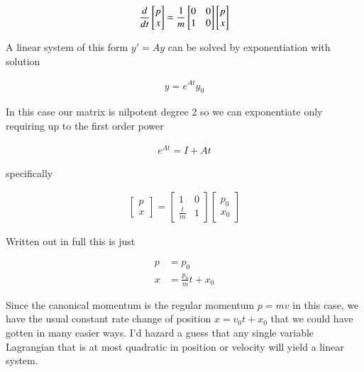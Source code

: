 \begin{align}\label{eqn:hamiltonian:boo4}
\frac{d}{dt}
\begin{bmatrix}
p \\
x
\end{bmatrix}
=
\frac{1}{m}
\begin{bmatrix}
0 & 0 \\
1 & 0
\end{bmatrix}
\begin{bmatrix}
p \\
x
\end{bmatrix}
\end{align}

A linear system of this form $y' = A y$ can be solved by exponentiation with solution

\begin{align}\label{eqn:hamiltonian:boo5}
y = e^{A t} y_0
\end{align}

In this case our matrix is nilpotent degree 2 so we can exponentiate only requiring up to the first order power

\begin{align}\label{eqn:hamiltonian:boo6}
e^{A t} = I + A t
\end{align}

specifically

\begin{align}\label{eqn:hamiltonian:boo7}
\begin{bmatrix}
p \\
x
\end{bmatrix}
=
\begin{bmatrix}
1 & 0 \\
\frac{t}{m} & 1
\end{bmatrix}
\begin{bmatrix}
p_0 \\
x_0
\end{bmatrix}
\end{align}

Written out in full this is just

\begin{align}\label{eqn:hamiltonian:boo8}
p &= p_0 \\
x &= \frac{p_0}{m} t + x_0
\end{align}

Since the canonical momentum is the regular momentum $p = m v$ in this case, we have the usual constant rate change of position $x = v_0 t + x_0$ that we could have gotten in many easier ways.  I'd hazard a guess that any single variable Lagrangian that is at most quadratic in position or velocity will yield a linear system.

